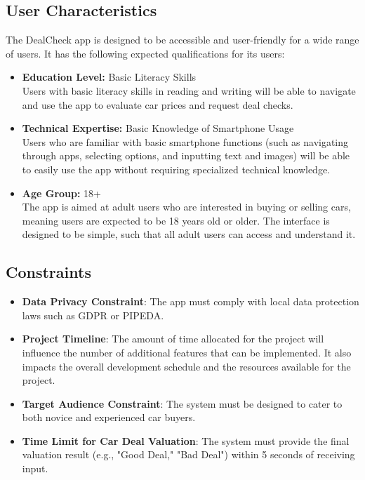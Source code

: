 \documentclass[]{article}
\begin{document}
\subsection{User Characteristics}
\label{sub:user_characteristics}
	The DealCheck app is designed to be accessible and user-friendly for a wide range of users. It has the following expected qualifications for its users:
\begin{itemize}
    \item \textbf{Education Level:} Basic Literacy Skills\\
    Users with basic literacy skills in reading and writing will be able to navigate and use the app to evaluate car prices and request deal checks.
    
    \item \textbf{Technical Expertise:} Basic Knowledge of Smartphone Usage\\
    Users who are familiar with basic smartphone functions (such as navigating through apps, selecting options, and inputting text and images) will be able to easily use the app without requiring specialized technical knowledge.
    
    \item \textbf{Age Group:} 18+\\
    The app is aimed at adult users who are interested in buying or selling cars, meaning users are expected to be 18 years old or older. The interface is designed to be simple, such that all adult users can access and understand it.
\end{itemize}

\subsection{Constraints}
\label{sub:constraints}
\begin{itemize}
    \item \textbf{Data Privacy Constraint}: The app must comply with local data protection laws such as GDPR or PIPEDA.
    \item \textbf{Project Timeline}: The amount of time allocated for the project will influence the number of additional features that can be implemented. It also impacts the overall development schedule and the resources available for the project.
    \item \textbf{Target Audience Constraint}: The system must be designed to cater to both novice and experienced car buyers.
    \item \textbf{Time Limit for Car Deal Valuation}: The system must provide the final valuation result (e.g., "Good Deal," "Bad Deal") within 5 seconds of receiving input.
\end{itemize}
\end{document}
